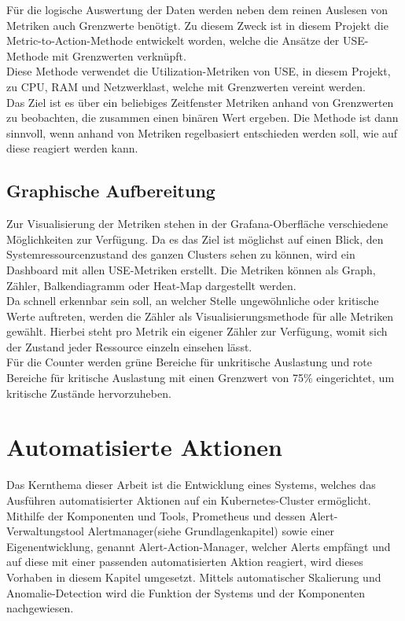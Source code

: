 \documentclass[a4paper,10pt]{scrartcl}
\begin{document}
Für die logische Auswertung der Daten werden neben dem reinen Auslesen von Metriken auch Grenzwerte benötigt. Zu diesem Zweck ist in diesem Projekt die \glqq Metric-to-Action\grqq-Methode entwickelt worden, welche die Ansätze der USE-Methode mit Grenzwerten verknüpft.\\
Diese Methode verwendet die Utilization-Metriken von USE, in diesem Projekt, zu CPU, RAM und Netzwerklast, welche mit Grenzwerten vereint werden.\\
Das Ziel ist es über ein beliebiges Zeitfenster Metriken anhand von Grenzwerten zu beobachten, die zusammen einen binären Wert ergeben. Die Methode ist dann sinnvoll, wenn anhand von Metriken regelbasiert entschieden werden soll, wie auf diese reagiert werden kann.

\subsection{Graphische Aufbereitung}

Zur Visualisierung der Metriken stehen in der Grafana-Oberfläche verschiedene Möglichkeiten zur Verfügung. Da es das Ziel ist möglichst auf einen Blick, den Systemressourcenzustand des ganzen Clusters sehen zu können, wird ein Dashboard mit allen USE-Metriken erstellt. Die Metriken können als Graph, Zähler, Balkendiagramm oder Heat-Map dargestellt werden.\\
Da schnell erkennbar sein soll, an welcher Stelle ungewöhnliche oder kritische Werte auftreten, werden die Zähler als Visualisierungsmethode für alle Metriken gewählt. Hierbei steht pro Metrik ein eigener Zähler zur Verfügung, womit sich der Zustand jeder Ressource einzeln einsehen lässt.\\
Für die Counter werden grüne Bereiche für unkritische Auslastung und rote Bereiche für kritische Auslastung mit einen Grenzwert von 75\% eingerichtet, um kritische Zustände hervorzuheben.

\section{Automatisierte Aktionen}

Das Kernthema dieser Arbeit ist die Entwicklung eines Systems, welches das Ausführen automatisierter Aktionen auf ein Kubernetes-Cluster ermöglicht. Mithilfe der Komponenten und Tools, Prometheus und dessen Alert-Verwaltungstool \glqq Alertmanager\grqq (siehe Grundlagenkapitel) sowie einer Eigenentwicklung, genannt \glqq Alert-Action-Manager\grqq, welcher Alerts empfängt und auf diese mit einer passenden automatisierten Aktion reagiert, wird dieses Vorhaben in diesem Kapitel umgesetzt. Mittels automatischer Skalierung und Anomalie-Detection wird die Funktion der Systems und der Komponenten nachgewiesen.
\end{document}
